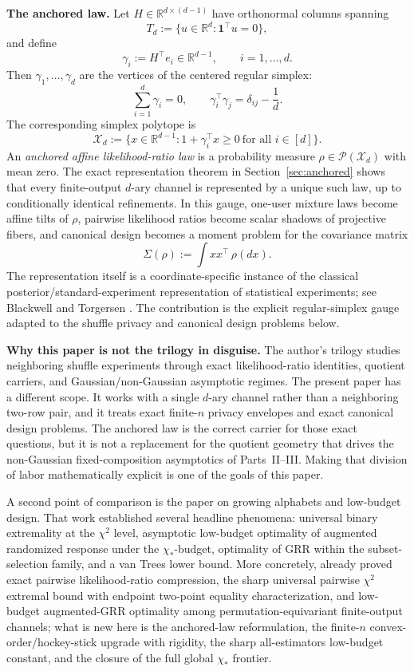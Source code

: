 \documentclass[11pt]{amsart}
\theoremstyle{definition}
\newcommand{\one}{\mathbf 1}
\newcommand{\R}{\mathbb R}
\newcommand{\cP}{\mathcal P}
\newcommand{\cX}{\mathcal X}
\begin{document}
\medskip
\noindent\textbf{The anchored law.}
Let $H\in \R^{d\times(d-1)}$ have orthonormal columns spanning
\[
T_d:=\{u\in \R^d:\one^\top u=0\},
\]
and define
\[
\gamma_i:=H^\top e_i\in \R^{d-1},\qquad i=1,\dots,d.
\]
Then $\gamma_1,\dots,\gamma_d$ are the vertices of the centered regular simplex:
\[
\sum_{i=1}^d \gamma_i=0,
\qquad
\gamma_i^\top \gamma_j=\delta_{ij}-\frac1d.
\]
The corresponding simplex polytope is
\[
\cX_d:=\{x\in \R^{d-1}:1+\gamma_i^\top x\ge 0\ \text{for all }i\in[d]\}.
\]
An \emph{anchored affine likelihood-ratio law} is a probability measure $\rho\in \cP(\cX_d)$ with mean zero. The exact representation theorem in Section~\ref{sec:anchored} shows that every finite-output $d$-ary channel is represented by a unique such law, up to conditionally identical refinements. In this gauge, one-user mixture laws become affine tilts of $\rho$, pairwise likelihood ratios become scalar shadows of projective fibers, and canonical design becomes a moment problem for the covariance matrix
\[
\Sigma(\rho):=\int xx^\top\,\rho(dx).
\]
The representation itself is a coordinate-specific instance of the classical posterior/standard-experiment representation of statistical experiments; see Blackwell \cite{blackwell-comparison} and Torgersen \cite[Chapter~2]{torgersen}. The contribution is the explicit regular-simplex gauge adapted to the shuffle privacy and canonical design problems below.

\medskip
\noindent\textbf{Why this paper is not the trilogy in disguise.}
The author's trilogy \cite{shvets-part1,shvets-part2,shvets-part3} studies neighboring shuffle experiments through exact likelihood-ratio identities, quotient carriers, and Gaussian/non-Gaussian asymptotic regimes. The present paper has a different scope. It works with a single $d$-ary channel rather than a neighboring two-row pair, and it treats exact finite-$n$ privacy envelopes and exact canonical design problems. The anchored law is the correct carrier for those exact questions, but it is not a replacement for the quotient geometry that drives the non-Gaussian fixed-composition asymptotics of Parts~II--III. Making that division of labor mathematically explicit is one of the goals of this paper.

A second point of comparison is the paper \cite{shvets-growing} on growing alphabets and low-budget design. That work established several headline phenomena: universal binary extremality at the $\chi^2$ level, asymptotic low-budget optimality of augmented randomized response under the $\chi_*$-budget, optimality of GRR within the subset-selection family, and a van Trees lower bound. More concretely, \cite{shvets-growing} already proved exact pairwise likelihood-ratio compression, the sharp universal pairwise $\chi^2$ extremal bound with endpoint two-point equality characterization, and low-budget augmented-GRR optimality among permutation-equivariant finite-output channels; what is new here is the anchored-law reformulation, the finite-$n$ convex-order/hockey-stick upgrade with rigidity, the sharp all-estimators low-budget constant, and the closure of the full global $\chi_*$ frontier.
\end{document}
